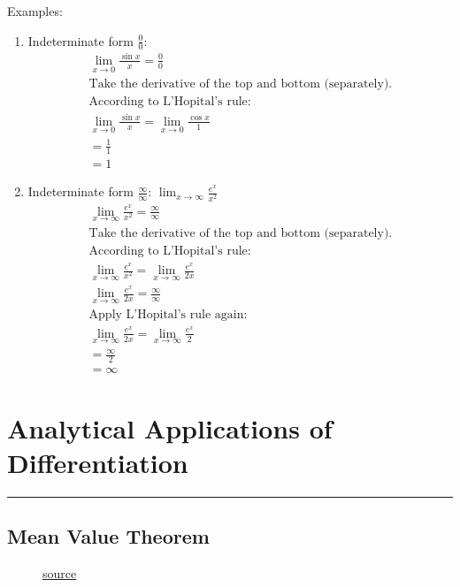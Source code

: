 \documentclass[12pt]{article}
\newcommand{\fline}{\par\noindent\rule{\textwidth}{0.1pt}} %
\begin{document}
\noindent Examples:
\begin{enumerate}
    \item Indeterminate form $\frac{0}{0}$:
          \begin{gather*}
              \lim_{x \to 0} \frac{\sin{x}}{x} = \frac{0}{0} \\[6pt]
              \text{Take the derivative of the top and bottom (separately).}\\
              \text{According to L'Hopital's rule:} \\
              \lim_{x \to 0} \frac{\sin{x}}{x} = \lim_{x \to 0} \frac{\cos{x}}{1} \\[6pt]
              = \frac{1}{1} \\[6pt]
              = 1
          \end{gather*}

    \item Indeterminate form $\frac{\infty}{\infty}$: $\lim_{x \to \infty} \frac{e^x}{x^2}$
          \begin{gather*}
              \lim_{x \to \infty} \frac{e^x}{x^2} = \frac{\infty}{\infty} \\[6pt]
              \text{Take the derivative of the top and bottom (separately).}\\
              \text{According to L'Hopital's rule:} \\
              \lim_{x \to \infty} \frac{e^x}{x^2} = \lim_{x \to \infty} \frac{e^x}{2x} \\[6pt]
              \lim_{x \to \infty} \frac{e^x}{2x} = \frac{\infty}{\infty} \\[6pt]
              \text{Apply L'Hopital's rule again:} \\
              \lim_{x \to \infty} \frac{e^x}{2x} = \lim_{x \to \infty} \frac{e^x}{2} \\[6pt]
              = \frac{\infty}{2} \\[6pt]
              = \infty
          \end{gather*}
\end{enumerate}

\section{Analytical Applications of Differentiation}
\fline
\subsection{Mean Value Theorem}
\begin{figure}
    \begin{center}
    \end{center}
    \caption{\href{https://www.khanacademy.org/math/ap-calculus-bc/bc-diff-analytical-applications-new/bc-5-1/a/mean-value-theorem-review?modal=1}{source}}
    \label{fig:meanvaluetheorem}
\end{figure}
\end{document}
